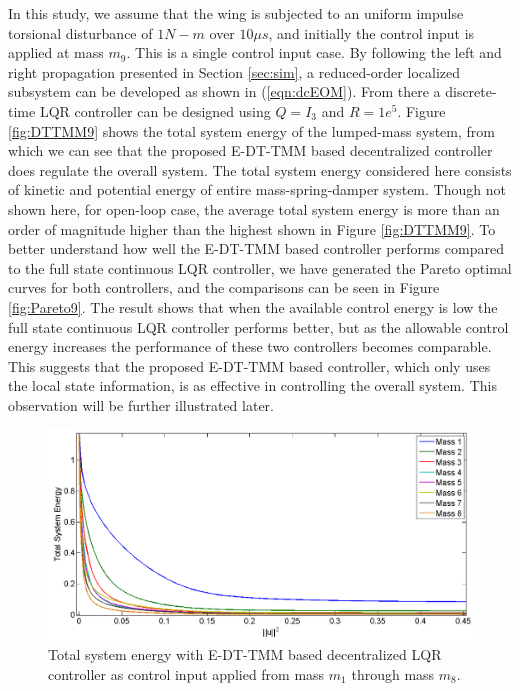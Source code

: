 \documentclass[11pt]{ucthesis}
\begin{document}
In this study, we assume that the wing is subjected to an uniform impulse torsional disturbance of $1 N-m$ over $10\mu s$, and initially the control input is applied at mass $m_9$. This is a single control input case. By following the left and right propagation presented in Section \ref{sec:sim}, a reduced-order localized subsystem can be developed as shown in (\ref{eqn:dcEOM}). From there a discrete-time LQR controller can be designed using $Q = I_3$ and $R = 1e^5$. Figure \ref{fig:DTTMM9} shows the total system energy of the lumped-mass system, from which we can see that the proposed E-DT-TMM based decentralized controller does regulate the overall system. The total system energy considered here consists of kinetic and potential energy of entire mass-spring-damper system. Though not shown here, for open-loop case, the average total system energy is more than an order of magnitude higher than the highest shown in Figure \ref{fig:DTTMM9}. To better understand how well the E-DT-TMM based controller performs compared to the full state continuous LQR controller, we have generated the Pareto optimal curves for both controllers, and the comparisons can be seen in Figure \ref{fig:Pareto9}. The result shows that when the available control energy is low the full state continuous LQR controller performs better, but as the allowable control energy increases the performance of these two controllers becomes comparable. This suggests that the proposed E-DT-TMM based controller, which only uses the local state information, is as effective in controlling the overall system. This observation will be further illustrated later. 

\begin{figure}[h]
\centering
\includegraphics[width=1\linewidth]{Figures/FirstHalfPareto.png}
\caption{Total system energy with E-DT-TMM based decentralized LQR controller as control input applied from mass $m_1$ through mass $m_8$.}
\label{fig:FirstHalfDPareto}
\end{figure}
 
\end{document}
